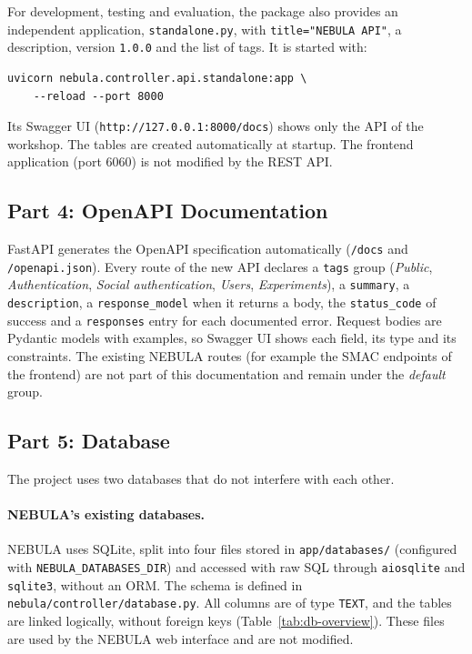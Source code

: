 \documentclass[9pt,a4paper,twocolumn]{article}
\begin{document}
For development, testing and evaluation, the package also provides an independent application, \texttt{standalone.py}, with \texttt{title="NEBULA API"}, a description, version \texttt{1.0.0} and the list of tags. It is started with:

\begin{lstlisting}[basicstyle=\ttfamily\footnotesize]
uvicorn nebula.controller.api.standalone:app \
    --reload --port 8000
\end{lstlisting}

Its Swagger UI (\texttt{http://127.0.0.1:8000/docs}) shows only the API of the workshop. The tables are created automatically at startup. The frontend application (port 6060) is not modified by the REST API.

\subsection{Part 4: OpenAPI Documentation}

FastAPI generates the OpenAPI specification automatically (\texttt{/docs} and \texttt{/openapi.json}). Every route of the new API declares a \texttt{tags} group (\textit{Public}, \textit{Authentication}, \textit{Social authentication}, \textit{Users}, \textit{Experiments}), a \texttt{summary}, a \texttt{description}, a \texttt{response\_model} when it returns a body, the \texttt{status\_code} of success and a \texttt{responses} entry for each documented error. Request bodies are Pydantic models with examples, so Swagger UI shows each field, its type and its constraints. The existing NEBULA routes (for example the SMAC endpoints of the frontend) are not part of this documentation and remain under the \textit{default} group.

\subsection{Part 5: Database}

The project uses two databases that do not interfere with each other.

\paragraph{NEBULA's existing databases.} NEBULA uses SQLite, split into four files stored in \texttt{app/databases/} (configured with \texttt{NEBULA\_DATABASES\_DIR}) and accessed with raw SQL through \texttt{aiosqlite} and \texttt{sqlite3}, without an ORM. The schema is defined in \texttt{nebula/controller/database.py}. All columns are of type \texttt{TEXT}, and the tables are linked logically, without foreign keys (Table~\ref{tab:db-overview}). These files are used by the NEBULA web interface and are not modified.
\end{document}

